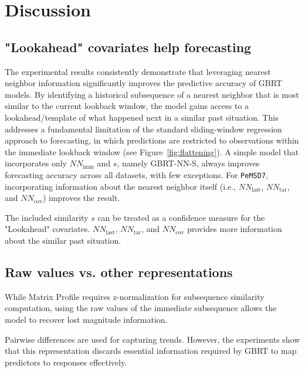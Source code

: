 \section{Discussion} \label{sec:discussion} %

\subsection{"Lookahead" covariates help forecasting} %

The experimental results consistently demonstrate that leveraging nearest neighbor information significantly improves the predictive accuracy of GBRT models. 
By identifying a historical subsequence of a nearest neighbor that is most similar to the current lookback window, the model gains access to a lookahead/template of what happened next in a similar past situation. 
This addresses a fundamental limitation of the standard sliding-window regression approach to forecasting, in which predictions are restricted to observations within the immediate lookback window (see Figure~\ref{fig:flattening}).
A simple model that incorporates only $NN_{\text{imm}}$ and $s$, namely \textsf{GBRT-NN-S}, always improves forecasting accuracy across all datasets, with few exceptions.
For \texttt{PeMSD7}, incorporating information about the nearest neighbor itself (i.e., $NN_{\text{last}}$, $NN_{\text{tar}}$, and $NN_{\text{cov}}$) improves the result.  

The included similarity $s$ can be treated as a confidence measure for the "Lookahead" covariates.
$NN_{\text{last}}$, $NN_{\text{tar}}$, and $NN_{\text{cov}}$ provides more information about the similar past situation.

\subsection{Raw values vs. other representations} %

While Matrix Profile requires z-normalization for subsequence similarity computation, using the raw values of the immediate subsequence allows the model to recover lost magnitude information.

Pairwise differences are used for capturing trends.
However, the experiments show that this representation discards essential information required by GBRT to map predictors to responses effectively.


